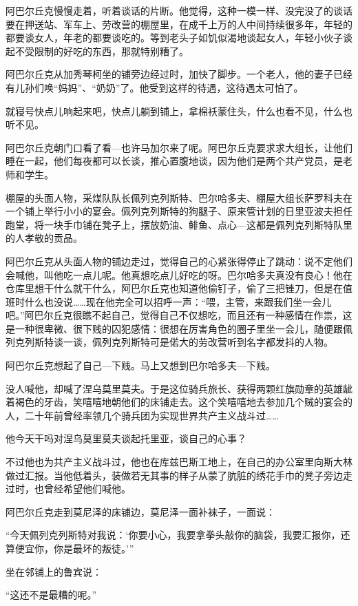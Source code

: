 阿巴尔丘克慢慢走着，听着谈话的片断。他觉得，这种一模一样、没完没了的谈话要在押送站、军车上、劳改营的棚屋里，在成千上万的人中间持续很多年，年轻的都要谈女人，年老的都要谈吃的。等到老头子如饥似渴地谈起女人，年轻小伙子谈起不受限制的好吃的东西，那就特别糟了。

阿巴尔丘克从加秀琴柯坐的铺旁边经过时，加快了脚步。一个老人，他的妻子已经有儿孙们唤“妈妈”、“奶奶”了。他受到这样的待遇，这待遇太可怕了。

就寝号快点儿响起来吧，快点儿躺到铺上，拿棉袄蒙住头，什么也看不见，什么也听不见。

阿巴尔丘克朝门口看了看—也许马加尔来了呢。阿巴尔丘克要求求大组长，让他们睡在一起，他们每夜都可以长谈，推心置腹地谈，因为他们是两个共产党员，是老师和学生。

棚屋的头面人物，采煤队队长佩列克列斯特、巴尔哈多夫、棚屋大组长萨罗科夫在一个铺上举行小小的宴会。佩列克列斯特的狗腿子、原来管计划的日里亚波夫担任跑堂，将一块手巾铺在凳子上，摆放奶油、鲱鱼、点心—这都是佩列克列斯特队里的人孝敬的贡品。

阿巴尔丘克从头面人物的铺边走过，觉得自己的心紧张得停止了跳动：说不定他们会喊他，叫他吃一点儿呢。他真想吃点儿好吃的呀。巴尔哈多夫真没有良心！他在仓库里想干什么就干什么，阿巴尔丘克也知道他偷钉子，偷了三把锉刀，但是在值班时什么也没说……现在他完全可以招呼一声：“喂，主管，来跟我们坐一会儿吧。”阿巴尔丘克很瞧不起自己，觉得自己不仅想吃，而且还有一种感情在作祟，这是一种很卑微、很下贱的囚犯感情：很想在厉害角色的圈子里坐一会儿，随便跟佩列克列斯特谈一谈，佩列克列斯特可是偌大的劳改营听到名字都发抖的人物。

阿巴尔丘克想起了自己—下贱。马上又想到巴尔哈多夫—下贱。

没人喊他，却喊了涅乌莫里莫夫。于是这位骑兵旅长、获得两颗红旗勋章的英雄龇着褐色的牙齿，笑嘻嘻地朝他们的床铺走去。这个笑嘻嘻地去参加几个贼的宴会的人，二十年前曾经率领几个骑兵团为实现世界共产主义战斗过……

他今天干吗对涅乌莫里莫夫谈起托里亚，谈自己的心事？

不过他也为共产主义战斗过，他也在库兹巴斯工地上，在自己的办公室里向斯大林做过汇报。当他低着头，装做若无其事的样子从蒙了肮脏的绣花手巾的凳子旁边走过时，也曾经希望他们喊他。

阿巴尔丘克走到莫尼泽的床铺边，莫尼泽一面补袜子，一面说：

“今天佩列克列斯特对我说：‘你要小心，我要拿拳头敲你的脑袋，我要汇报你，还算便宜你，你是最坏的叛徒。’”

坐在邻铺上的鲁宾说：

“这还不是最糟的呢。”


